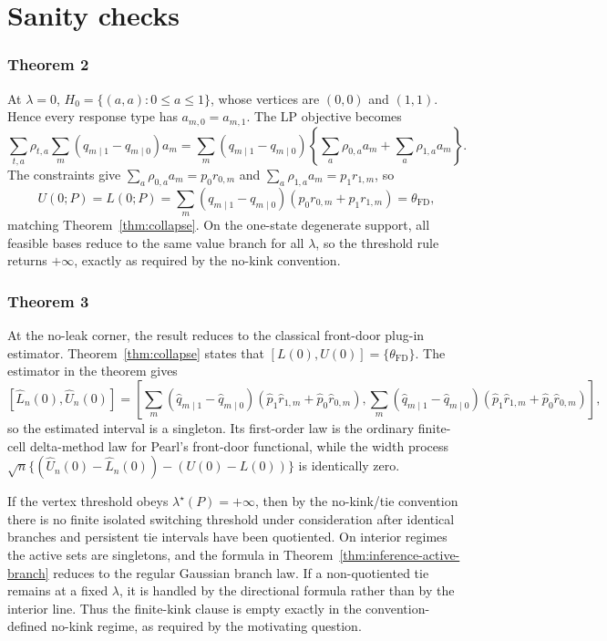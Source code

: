\documentclass[11pt]{article}
\theoremstyle{definition}
\theoremstyle{plain}
\theoremstyle{remark}
\begin{document}
\section{Sanity checks}
\subsubsection*{Theorem 2}
At \(\lambda=0\), \(H_0=\{(a,a):0\le a\le1\}\), whose vertices are \((0,0)\) and \((1,1)\). Hence every
response type has \(a_{m,0}=a_{m,1}\). The LP objective becomes
\[
  \sum_{t,a}\rho_{t,a}\sum_m(q_{m\mid1}-q_{m\mid0})a_m
  =\sum_m(q_{m\mid1}-q_{m\mid0})
    \left\{\sum_a\rho_{0,a}a_m+\sum_a\rho_{1,a}a_m\right\}.
\]
The constraints give
\(\sum_a\rho_{0,a}a_m=p_0r_{0,m}\) and
\(\sum_a\rho_{1,a}a_m=p_1r_{1,m}\), so
\[
  U(0;P)=L(0;P)
  =\sum_m(q_{m\mid1}-q_{m\mid0})(p_0r_{0,m}+p_1r_{1,m})
  =\theta_{\mathrm{FD}},
\]
matching Theorem~\ref{thm:collapse}. On the one-state degenerate support, all feasible bases reduce to the
same value branch for all \(\lambda\), so the threshold rule returns \(+\infty\), exactly as required by the
no-kink convention.

\subsubsection*{Theorem 3}
At the no-leak corner, the result reduces to the classical front-door plug-in
estimator.  Theorem~\ref{thm:collapse} states that
\([L(0),U(0)]=\{\theta_{\mathrm{FD}}\}\).  The estimator in the theorem gives
\[
  [\widehat L_n(0),\widehat U_n(0)]
  =
  \left[
    \sum_m(\widehat q_{m\mid1}-\widehat q_{m\mid0})
          (\widehat p_1\widehat r_{1,m}+\widehat p_0\widehat r_{0,m}),
    \sum_m(\widehat q_{m\mid1}-\widehat q_{m\mid0})
          (\widehat p_1\widehat r_{1,m}+\widehat p_0\widehat r_{0,m})
  \right],
\]
so the estimated interval is a singleton.  Its first-order law is the ordinary
finite-cell delta-method law for Pearl's front-door functional, while the width process
\(\sqrt n\{(\widehat U_n(0)-\widehat L_n(0))-(U(0)-L(0))\}\) is identically zero.

If the vertex threshold obeys \(\lambda^\star(P)=+\infty\), then by the no-kink/tie
convention there is no finite isolated switching threshold under consideration after
identical branches and persistent tie intervals have been quotiented.  On interior
regimes the active sets are singletons, and the formula in
Theorem~\ref{thm:inference-active-branch} reduces to the regular Gaussian branch
law.  If a non-quotiented tie remains at a fixed \(\lambda\), it is handled by the
directional formula rather than by the interior line.  Thus the finite-kink clause is
empty exactly in the convention-defined no-kink regime, as required by the motivating
question.
\end{document}
